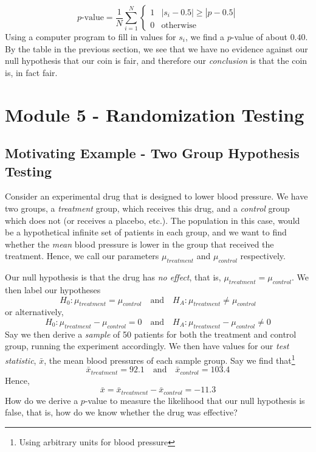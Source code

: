\documentclass[10pt]{article}
\newcommand{\spacer}[0]{\par\vspace{0.1in}}
\begin{document}
$$
    \text{$p$-value}=\frac{1}{N}\sum_{i=1}^N \begin{cases}1&|s_i-0.5|\geq|\hat p - 0.5|\\0&\text{otherwise}\end{cases}
$$
Using a computer program to fill in values for $s_i$, we find a $p$-value of about $0.40$. By the table in the previous section, we see that we have no evidence against our null hypothesis that our coin is fair, and therefore our \textit{conclusion} is that the coin is, in fact fair.
\section{Module 5 - Randomization Testing}
\subsection{Motivating Example - Two Group Hypothesis Testing}
Consider an experimental drug that is designed to lower blood pressure. We have two groups, a \textit{treatment} group, which receives this drug, and a \textit{control} group which does not (or receives a placebo, etc.). The population in this case, would be a hypothetical infinite set of patients in each group, and we want to find whether the \textit{mean} blood pressure is lower in the group that received the treatment. Hence, we call our parameters $\mu_{treatment}$ and $\mu_{control}$ respectively.
\spacer
Our null hypothesis is that the drug has \textit{no effect}, that is, $\mu_{treatment}=\mu_{control}$. We then label our hypotheses
$$
    H_0:\mu_{treatment}=\mu_{control}\quad\text{and}\quad H_A:\mu_{treatment}\neq \mu_{control}
$$
or alternatively,
$$
    H_0:\mu_{treatment}-\mu_{control}=0\quad\text{and}\quad H_A:\mu_{treatment}- \mu_{control}\neq 0
$$
Say we then derive a \textit{sample} of 50 patients for both the treatment and control group, running the experiment accordingly. We then have values for our \textit{test statistic}, $\bar x$, the mean blood pressures of each sample group. Say we find that\footnote{Using arbitrary units for blood pressure}
$$
    \bar x_{treatment} = 92.1\quad\text{and}\quad\bar x_{control}=103.4
$$
Hence,
$$
    \bar x =\bar x_{treatment}-\bar x_{control} = -11.3
$$
How do we derive a $p$-value to measure the likelihood that our null hypothesis is false, that is, how do we know whether the drug was effective?
\end{document}
